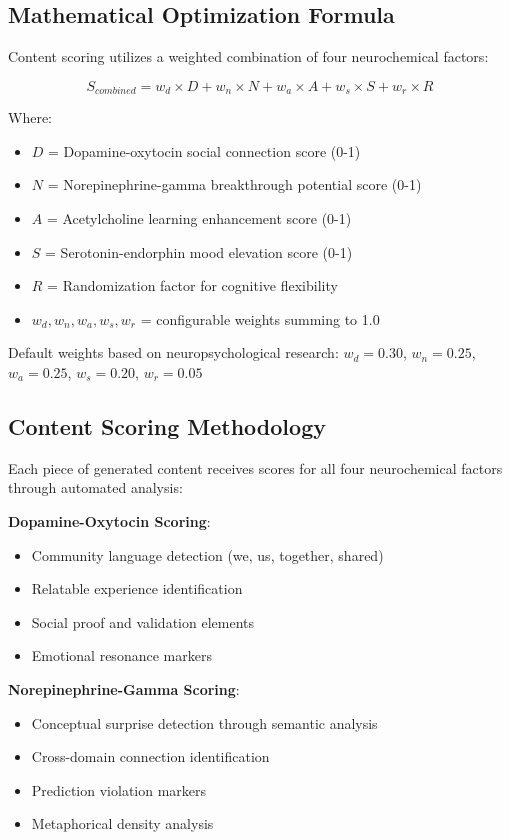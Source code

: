 \documentclass[11pt,letterpaper]{article}
\begin{document}
\subsection{Mathematical Optimization Formula}

Content scoring utilizes a weighted combination of four neurochemical factors:

\begin{equation}
S_{combined} = w_d \times D + w_n \times N + w_a \times A + w_s \times S + w_r \times R
\end{equation}

Where:
\begin{itemize}
    \item $D$ = Dopamine-oxytocin social connection score (0-1)
    \item $N$ = Norepinephrine-gamma breakthrough potential score (0-1)
    \item $A$ = Acetylcholine learning enhancement score (0-1)
    \item $S$ = Serotonin-endorphin mood elevation score (0-1)
    \item $R$ = Randomization factor for cognitive flexibility
    \item $w_d, w_n, w_a, w_s, w_r$ = configurable weights summing to 1.0
\end{itemize}

Default weights based on neuropsychological research: $w_d = 0.30$, $w_n = 0.25$, $w_a = 0.25$, $w_s = 0.20$, $w_r = 0.05$

\subsection{Content Scoring Methodology}

Each piece of generated content receives scores for all four neurochemical factors through automated analysis:

\textbf{Dopamine-Oxytocin Scoring}:
\begin{itemize}
    \item Community language detection (we, us, together, shared)
    \item Relatable experience identification
    \item Social proof and validation elements
    \item Emotional resonance markers
\end{itemize}

\textbf{Norepinephrine-Gamma Scoring}:
\begin{itemize}
    \item Conceptual surprise detection through semantic analysis
    \item Cross-domain connection identification
    \item Prediction violation markers
    \item Metaphorical density analysis
\end{itemize}
\end{document}
